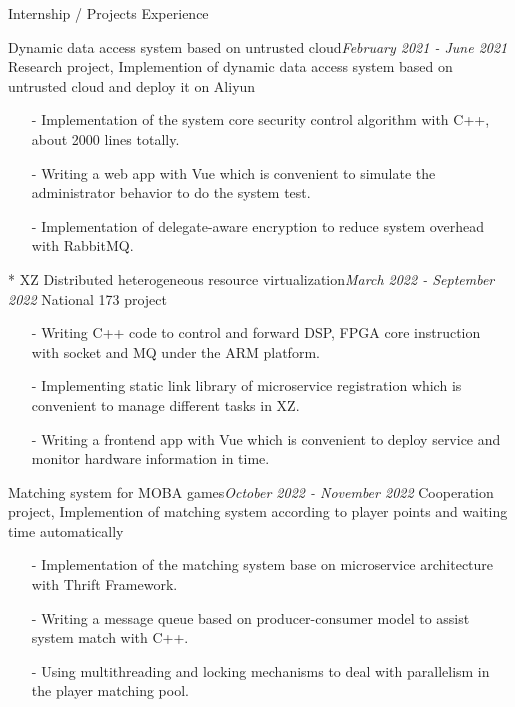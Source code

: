 \documentclass{resume} %
\begin{document}
\begin{rSection}{Internship / Projects Experience}
\begin{rSubsection}{Dynamic data access system based on untrusted cloud}{\em February 2021 - June 2021}
{Research project, Implemention of dynamic data access system based on untrusted cloud and deploy it on Aliyun}
{}
    \item[]
    \begin{itemize}
    \setlength\itemsep{-0.5em}
        \item[-] Implementation of the system core security control algorithm with C++, about 2000 lines totally.
        \item[-] Writing a web app with Vue which is convenient to simulate the administrator behavior to do the system test.
        \item[-] Implementation of delegate-aware encryption to reduce system overhead with RabbitMQ.
    \end{itemize}
\end{rSubsection}


\begin{rSubsection}{* XZ Distributed heterogeneous resource virtualization}{\em March 2022 - September 2022}
{National 173 project}
{}
    \item[]
    \begin{itemize}
    \setlength\itemsep{-0.5em}
        \item[-] Writing C++ code to control and forward DSP, FPGA core instruction with socket and MQ under the ARM platform.
        \item[-] Implementing static link library of microservice registration which is convenient to manage different tasks in XZ.
        \item[-] Writing a frontend app with Vue which is convenient to deploy service and monitor hardware information in time.
    \end{itemize}
\end{rSubsection}


\begin{rSubsection}{Matching system for MOBA games}{\em October 2022 - November 2022}
{Cooperation project, Implemention of matching system according to player points and waiting time automatically}
{}
    \item[]
    \begin{itemize}
    \setlength\itemsep{-0.5em}
        \item[-] Implementation of the matching system base on microservice architecture with Thrift Framework.
        \item[-] Writing a message queue based on producer-consumer model to assist system match with C++.
        \item[-] Using multithreading and locking mechanisms to deal with parallelism in the player matching pool.
    \end{itemize}
\end{rSubsection}

\end{rSection}
\end{document}
